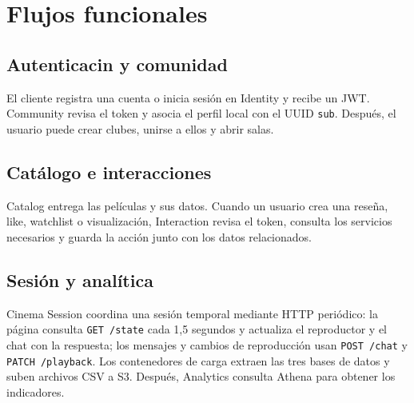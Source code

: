 ﻿\chapter{Flujos funcionales}
\section{Autenticacin y comunidad}
El cliente registra una cuenta o inicia sesión en Identity y recibe un JWT. Community revisa el token y asocia el perfil local con el UUID \texttt{sub}. Después, el usuario puede crear clubes, unirse a ellos y abrir salas.
\section{Catálogo e interacciones}
Catalog entrega las películas y sus datos. Cuando un usuario crea una reseña, like, watchlist o visualización, Interaction revisa el token, consulta los servicios necesarios y guarda la acción junto con los datos relacionados.
\section{Sesión y analítica}
Cinema Session coordina una sesión temporal mediante HTTP periódico: la página consulta \texttt{GET /state} cada 1,5 segundos y actualiza el reproductor y el chat con la respuesta; los mensajes y cambios de reproducción usan \texttt{POST /chat} y \texttt{PATCH /playback}. Los contenedores de carga extraen las tres bases de datos y suben archivos CSV a S3. Después, Analytics consulta Athena para obtener los indicadores.
